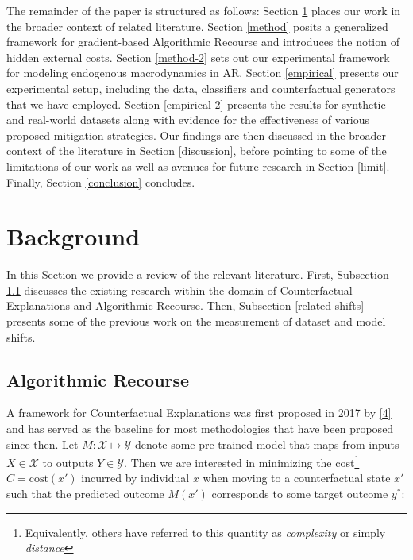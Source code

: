\documentclass[conference,final,]{IEEEtran}
\begin{document}
The remainder of the paper is structured as follows: Section \ref{related} places our work in the broader context of related literature. Section \ref{method} posits a generalized framework for gradient-based Algorithmic Recourse and introduces the notion of hidden external costs. Section \ref{method-2} sets out our experimental framework for modeling endogenous macrodynamics in AR. Section \ref{empirical} presents our experimental setup, including the data, classifiers and counterfactual generators that we have employed. Section \ref{empirical-2} presents the results for synthetic and real-world datasets along with evidence for the effectiveness of various proposed mitigation strategies. Our findings are then discussed in the broader context of the literature in Section \ref{discussion}, before pointing to some of the limitations of our work as well as avenues for future research in Section \ref{limit}. Finally, Section \ref{conclusion} concludes.

\hypertarget{related}{%
\section{Background}\label{related}}

In this Section we provide a review of the relevant literature. First, Subsection \ref{related-recourse} discusses the existing research within the domain of Counterfactual Explanations and Algorithmic Recourse. Then, Subsection \ref{related-shifts} presents some of the previous work on the measurement of dataset and model shifts.

\hypertarget{related-recourse}{%
\subsection{Algorithmic Recourse}\label{related-recourse}}

A framework for Counterfactual Explanations was first proposed in 2017 by \protect\hyperlink{ref-wachter2017counterfactual}{{[}4{]}} and has served as the baseline for most methodologies that have been proposed since then. Let \(M: \mathcal{X} \mapsto \mathcal{Y}\) denote some pre-trained model that maps from inputs \(X \in \mathcal{X}\) to outputs \(Y \in \mathcal{Y}\). Then we are interested in minimizing the cost\footnote{Equivalently, others have referred to this quantity as \emph{complexity} or simply \emph{distance}} \(C=\text{cost}(x\prime)\) incurred by individual \(x\) when moving to a counterfactual state \(x\prime\) such that the predicted outcome \(M(x\prime)\) corresponds to some target outcome \(y^*\):
\end{document}
